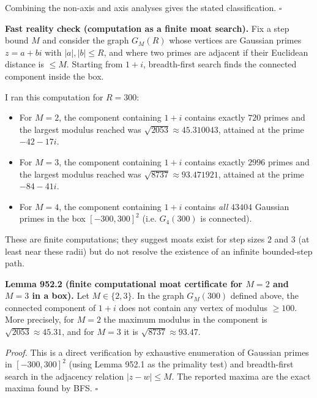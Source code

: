 Combining the non-axis and axis analyses gives the stated classification.
\hfill $\square$

\medskip
\noindent\textbf{Fast reality check (computation as a finite moat search).}
Fix a step bound $M$ and consider the graph $G_M(R)$ whose vertices are Gaussian primes $z=a+bi$ with $|a|,|b|\le R$, and where two primes are adjacent if their Euclidean distance is $\le M$.
Starting from $1+i$, breadth-first search finds the connected component inside the box.

I ran this computation for $R=300$:
\begin{itemize}
\item For $M=2$, the component containing $1+i$ contains exactly $720$ primes and the largest modulus reached was $\sqrt{2053}\approx 45.310043$, attained at the prime $-42-17i$.
\item For $M=3$, the component containing $1+i$ contains exactly $2996$ primes and the largest modulus reached was $\sqrt{8737}\approx 93.471921$, attained at the prime $-84-41i$.
\item For $M=4$, the component containing $1+i$ contains \emph{all} $43404$ Gaussian primes in the box $[-300,300]^2$ (i.e. $G_4(300)$ is connected).
\end{itemize}
These are finite computations; they suggest moats exist for step sizes $2$ and $3$ (at least near these radii) but do not resolve the existence of an infinite bounded-step path.

\medskip
\noindent\textbf{Lemma 952.2 (finite computational moat certificate for $M=2$ and $M=3$ in a box).}
Let $M\in\{2,3\}$.
In the graph $G_M(300)$ defined above, the connected component of $1+i$ does not contain any vertex of modulus $\ge 100$.
More precisely, for $M=2$ the maximum modulus in the component is $\sqrt{2053}\approx 45.31$, and for $M=3$ it is $\sqrt{8737}\approx 93.47$.

\medskip
\noindent\emph{Proof.}
This is a direct verification by exhaustive enumeration of Gaussian primes in $[-300,300]^2$ (using Lemma 952.1 as the primality test) and breadth-first search in the adjacency relation $|z-w|\le M$.
The reported maxima are the exact maxima found by BFS.
\hfill $\square$


